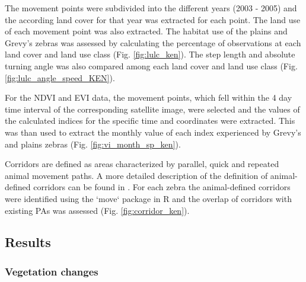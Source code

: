 \documentclass[12pt,a4paper, twoside, english]{article}
\begin{document}


The movement points were subdivided into the different years (2003 - 2005) and the according land cover for that year was extracted for each point. The land use of each movement point was also extracted. The habitat use of the plains and Grevy's zebras was assessed by calculating the percentage of observations at each land cover and land use class (Fig. \ref{fig:lulc_ken}). The step length and absolute turning angle was also compared among each land cover and land use class (Fig. \ref{fig:lulc_angle_speed_KEN}).

For the NDVI and EVI data, the movement points, which fell within the 4 day time interval of the corresponding satellite image, were selected and the values of the calculated indices for the specific time and coordinates were extracted. This was than used to extract the monthly value of each index experienced by Grevy's and plains zebras (Fig. \ref{fig:vi_month_sp_ken}).


Corridors are defined as areas characterized by parallel, quick and repeated animal movement paths. A more detailed description of the definition of animal-defined corridors can be found in \cite{LaPoint2013}. For each zebra the animal-defined corridors were identified using the `move` package in R and the overlap of corridors with existing PAs was assessed (Fig. \ref{fig:corridor_ken}).


\subsection{Results}

\subsubsection{Vegetation changes}
\end{document}
